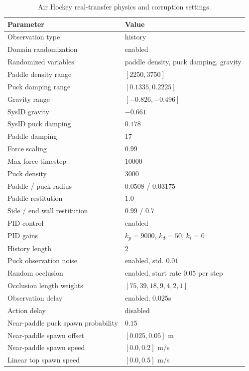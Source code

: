 \begin{table}[h]
\centering
\small
\setlength{\tabcolsep}{5pt}
\caption{Air Hockey real-transfer physics and corruption settings.}
\label{tab:appendix-air-hockey-real-transfer}
\begin{tabular}{ll}
\toprule
Parameter & Value \\
\midrule
Observation type & history \\
Domain randomization & enabled \\
Randomized variables & paddle density, puck damping, gravity \\
Paddle density range & $[2250,3750]$ \\
Puck damping range & $[0.1335,0.2225]$ \\
Gravity range & $[-0.826,-0.496]$ \\
SysID gravity & $-0.661$ \\
SysID puck damping & $0.178$ \\
Paddle damping & $17$ \\
Force scaling & $0.99$ \\
Max force timestep & $10000$ \\
Puck density & $3000$ \\
Paddle / puck radius & $0.0508$ / $0.03175$ \\
Paddle restitution & $1.0$ \\
Side / end wall restitution & $0.99$ / $0.7$ \\
PID control & enabled \\
PID gains & $k_p=9000$, $k_d=50$, $k_i=0$ \\
History length & $2$ \\
Puck observation noise & enabled, std. $0.01$ \\
Random occlusion & enabled, start rate $0.05$ per step \\
Occlusion length weights & $[75,39,18,9,4,2,1]$ \\
Observation delay & enabled, $0.025$s \\
Action delay & disabled \\
Near-paddle puck spawn probability & $0.15$ \\
Near-paddle spawn offset & $[0.025,0.05]$ m \\
Near-paddle spawn speed & $[0.0,0.2]$ m/s \\
Linear top spawn speed & $[0.0,0.5]$ m/s \\
\bottomrule
\end{tabular}
\end{table}

